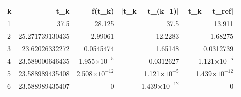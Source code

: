 {\footnotesize
\begin{longtable}{lrrrr}
\toprule
\textbf{k} & \textbf{t\_k} & \textbf{f(t\_k)} & \textbf{|t\_k $-$ t\_(k$-$1)|} & \textbf{|t\_k $-$ t\_ref|} \\
\midrule
\endhead
1 & 37.5 & 28.125 & 37.5 & 13.911 \\
2 & 25.271739130435 & 2.99061 & 12.2283 & 1.68275 \\
3 & 23.62026332272 & 0.0545474 & 1.65148 & 0.0312739 \\
4 & 23.589000646435 & 1.955$\times10^{-5}$ & 0.0312627 & 1.121$\times10^{-5}$ \\
5 & 23.588989435408 & 2.508$\times10^{-12}$ & 1.121$\times10^{-5}$ & 1.439$\times10^{-12}$ \\
6 & 23.588989435407 & 0 & 1.439$\times10^{-12}$ & 0 \\
\bottomrule
\end{longtable}
}

